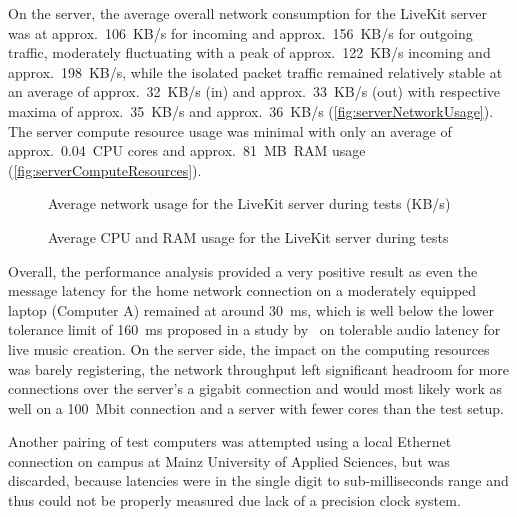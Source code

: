 On the server, the average overall network consumption for the LiveKit server was at approx.~106~\ac{KB/s} for incoming and approx.~156~KB/s for outgoing traffic, moderately fluctuating with a peak of approx.~122~\ac{KB/s} incoming and approx.~198~\ac{KB/s}, while the isolated packet traffic remained relatively stable at an average of approx.~32~\ac{KB/s} (in) and approx.~33~\ac{KB/s} (out) with respective maxima of approx.~35~\ac{KB/s} and approx.~36~\ac{KB/s} (\autoref{fig:serverNetworkUsage}).
The server compute resource usage was minimal with only an average of approx.~0.04~\ac{CPU} cores and approx.~81~\ac{MB}~\ac{RAM} usage (\autoref{fig:serverComputeResources}).

\begin{figure*}[!ht]
\hfill

\caption[Server network usage during tests]{Average network usage for the LiveKit server during tests (\ac{KB/s})\protect}
\label{fig:serverNetworkUsage}
\end{figure*}

\begin{figure*}[!ht]
\hfill

\caption[Server compute resources usage during tests]{Average \ac{CPU} and \ac{RAM} usage for the LiveKit server during tests\protect}
\label{fig:serverComputeResources}
\end{figure*}

Overall, the performance analysis provided a very positive result as even the message latency for the home network connection on a moderately equipped laptop (Computer A) remained at around 30~\ac{ms}, which is well below the lower tolerance limit of 160~\ac{ms} proposed in a study by~\cite{audioLatency} on tolerable audio latency for live music creation.
On the server side, the impact on the computing resources was barely registering, the network throughput left significant headroom for more connections over the server's a gigabit connection and would most likely work as well on a 100~\ac{Mbit} connection and a server with fewer cores than the test setup.

Another pairing of test computers was attempted using a local Ethernet connection on campus at Mainz University of Applied Sciences, but was discarded, because latencies were in the single digit to sub-milliseconds range and thus could not be properly measured due lack of a precision clock system.

